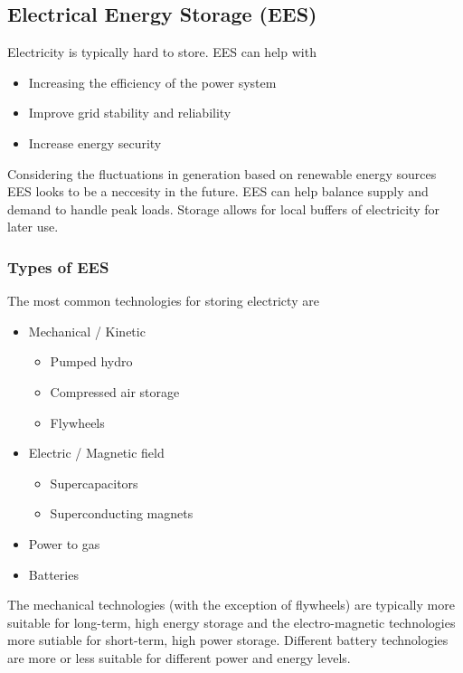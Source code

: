 \subsection{Electrical Energy Storage (EES)}
Electricity is typically hard to store. EES can help with
\begin{itemize}
    \item Increasing the efficiency of the power system
    \item Improve grid stability and reliability
    \item Increase energy security
\end{itemize}
Considering the fluctuations in generation based on renewable energy sources EES looks to be a neccesity in the future.
EES can help balance supply and demand to handle peak loads.
Storage allows for local buffers of electricity for later use.

\subsubsection{Types of EES}
The most common technologies for storing electricty are

\begin{itemize}
    \item Mechanical / Kinetic
        \begin{itemize}
            \item Pumped hydro
            \item Compressed air storage
            \item Flywheels
        \end{itemize}
    \item Electric / Magnetic field
        \begin{itemize}
            \item Supercapacitors
            \item Superconducting magnets
        \end{itemize}
    \item Power to gas
    \item Batteries
\end{itemize}

The mechanical technologies (with the exception of flywheels) are typically more suitable for long-term, high energy storage and the electro-magnetic technologies more sutiable for short-term, high power storage.
Different battery technologies are more or less suitable for different power and energy levels.

